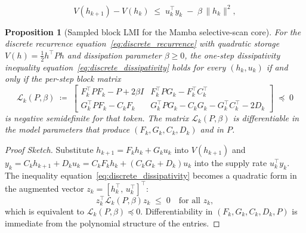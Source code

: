 \documentclass[10pt,a4paper]{amsart}
\newtheorem{proposition}{Proposition}
\def\eqref#1{equation~\ref{#1}}
\begin{document}
\begin{equation}
\label{eq:discrete_dissipativity}
V(h_{k+1}) - V(h_k) \;\le\; u_k^{\top} y_k \;-\; \beta\, \|h_k\|^2,
\end{equation}

\begin{proposition}[Sampled block LMI for the Mamba selective-scan core]
\label{prop:sampled_lmi}
For the discrete recurrence \eqref{eq:discrete_recurrence} with quadratic storage $V(h)=\tfrac12 h^\top P h$ and dissipation parameter $\beta\ge 0$, the one-step dissipativity inequality \eqref{eq:discrete_dissipativity} holds for every $(h_k,u_k)$ if and only if the per-step block matrix
\begin{equation}
\label{eq:sampled_lmi}
\mathcal{L}_k(P,\beta) \;\coloneqq\;
\begin{bmatrix}
F_k^\top P F_k - P + 2\beta I & F_k^\top P G_k - F_k^\top C_k^\top \\[2pt]
G_k^\top P F_k - C_k F_k & G_k^\top P G_k - C_k G_k - G_k^\top C_k^\top - 2 D_k
\end{bmatrix}
\;\preceq\; 0
\end{equation}
is negative semidefinite for that token. The matrix $\mathcal{L}_k(P,\beta)$ is differentiable in the model parameters that produce $(F_k,G_k,C_k,D_k)$ and in $P$.
\end{proposition}

\begin{proof}[Proof Sketch]
Substitute $h_{k+1}=F_k h_k + G_k u_k$ into $V(h_{k+1})$ and $y_k = C_k h_{k+1} + D_k u_k = C_k F_k h_k + (C_k G_k + D_k) u_k$ into the supply rate $u_k^\top y_k$. The inequality \eqref{eq:discrete_dissipativity} becomes a quadratic form in the augmented vector $z_k = [h_k^\top,\, u_k^\top]^\top$:
\[
z_k^\top \mathcal{L}_k(P,\beta) z_k \;\le\; 0 \quad \text{for all } z_k,
\]
which is equivalent to $\mathcal{L}_k(P,\beta)\preceq 0$. Differentiability in $(F_k,G_k,C_k,D_k,P)$ is immediate from the polynomial structure of the entries.
\end{proof}
\end{document}
